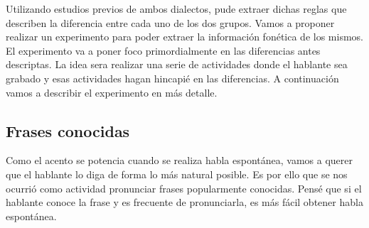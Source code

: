 \documentclass[11pt,a4paper,twoside]{tesis}
\begin{document}

Utilizando estudios previos de ambos dialectos, pude extraer dichas reglas que describen la diferencia entre cada uno de los dos grupos. Vamos a proponer realizar un experimento para poder extraer la información fonética de los mismos. El experimento va a poner foco primordialmente en las diferencias antes descriptas. La idea sera realizar una serie de actividades donde el hablante sea grabado y esas actividades hagan hincapié en las diferencias. A continuación vamos a describir el experimento en más detalle.




\subsection{Frases conocidas}

Como el acento se potencia cuando se realiza habla espontánea, vamos a querer que el hablante lo diga de forma lo más natural posible. Es por ello que se nos ocurrió como actividad pronunciar frases popularmente conocidas. Pensé que si el hablante conoce la frase y es frecuente de pronunciarla, es más fácil obtener habla espontánea.
\end{document}
